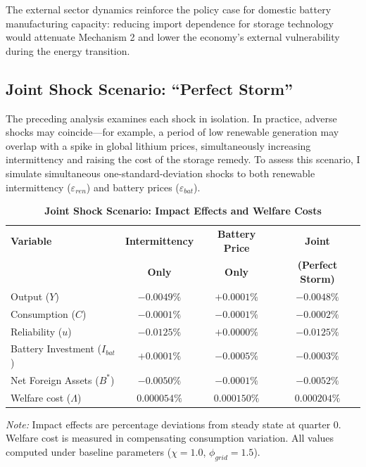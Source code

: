 \documentclass[12pt, a4paper]{article}
\begin{document}
The external sector dynamics reinforce the policy case for domestic battery manufacturing capacity: reducing import dependence for storage technology would attenuate Mechanism 2 and lower the economy's external vulnerability during the energy transition.

\subsection{Joint Shock Scenario: ``Perfect Storm''} \label{subsec:joint_shock}

The preceding analysis examines each shock in isolation. In practice, adverse shocks may coincide---for example, a period of low renewable generation may overlap with a spike in global lithium prices, simultaneously increasing intermittency and raising the cost of the storage remedy. To assess this scenario, I simulate simultaneous one-standard-deviation shocks to both renewable intermittency ($\varepsilon_{ren}$) and battery prices ($\varepsilon_{bat}$).

\begin{table}[H]
    \centering
    \caption{\textbf{Joint Shock Scenario: Impact Effects and Welfare Costs}}
    \label{tab:joint_shock}
    \renewcommand{\arraystretch}{1.3}
    \begin{tabular}{l c c c}
        \toprule
        \textbf{Variable} & \textbf{Intermittency} & \textbf{Battery Price} & \textbf{Joint} \\
        & \textbf{Only} & \textbf{Only} & \textbf{(Perfect Storm)} \\
        \midrule
        Output ($Y$) & $-0.0049\%$ & $+0.0001\%$ & $-0.0048\%$ \\
        Consumption ($C$) & $-0.0001\%$ & $-0.0001\%$ & $-0.0002\%$ \\
        Reliability ($u$) & $-0.0125\%$ & $+0.0000\%$ & $-0.0125\%$ \\
        Battery Investment ($I_{bat}$) & $+0.0001\%$ & $-0.0005\%$ & $-0.0003\%$ \\
        Net Foreign Assets ($B^*$) & $-0.0050\%$ & $-0.0001\%$ & $-0.0052\%$ \\
        \midrule
        Welfare cost ($\Lambda$) & $0.000054\%$ & $0.000150\%$ & $0.000204\%$ \\
        \bottomrule
    \end{tabular}
    \vspace{0.2cm}
    \parbox{\textwidth}{\footnotesize \textit{Note:} Impact effects are percentage deviations from steady state at quarter 0. Welfare cost is measured in compensating consumption variation. All values computed under baseline parameters ($\chi = 1.0$, $\phi_{grid} = 1.5$).}
\end{table}
\end{document}
